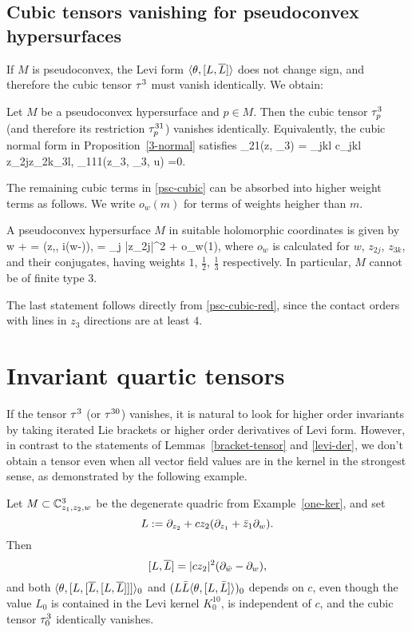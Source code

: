 \documentclass[12pt]{amsart}
\begin{document}
\subsection{Cubic tensors vanishing for pseudoconvex hypersurfaces}
If $M$ is pseudoconvex, the Levi form $\langle \theta, [L, \overline{L}]\rangle$
does not change sign, and therefore the cubic tensor $\tau^3$ must vanish identically. We obtain:

\bl{}
Let $M$ be a pseudoconvex hypersurface and $p\in M$.
Then the cubic tensor $\tau^3_p$ (and therefore its restriction $\tau^{31}_p$) vanishes identically.
Equivalently, the cubic normal form in Proposition~\ref{3-normal} satisfies
\beq{}
	\phi_{21}(z, \z_3) = \sum_{jkl} c_{jkl} z_{2j}z_{2k}\z_{3l},
	\quad
	\phi_{111}(z_3, \z_3, u) =0.
\eeq
\el

The remaining cubic terms in \eqref{psc-cubic} 
can be absorbed into higher weight terms as follows.
We write $o_w(m)$ for terms of weights heigher than $m$.

\bc{}
A pseudoconvex hypersurface $M$ in suitable holomorphic coordinates
is given by
\beq{}
w + \w = \phi(z,\z, i(w-\w)), 
\quad
\phi =
 \sum_j |z_{2j}|^2 + o_w(1),
\eeq
where $o_w$ is calculated for $w$, $z_{2j}$, $z_{3k}$, and their conjugates, 
having weights 
$1$, $\frac12$, $\frac13$ respectively.
In particular, $M$ cannot be of finite type $3$.
\ec

The last statement follows directly from \eqref{psc-cubic-red},
since the contact orders  with lines in $z_3$ directions
are at least $4$.



\section{Invariant quartic tensors}
If the tensor $\tau^3$ (or $\tau^{30}$) vanishes,
it is natural to look for higher order invariants by taking iterated Lie brackets
or higher order derivatives of Levi form.
However, 
in contrast to the statements of Lemmas~\ref{bracket-tensor} 
and \ref{levi-der},
we don't obtain a tensor
even when all vector field values are in the kernel in the strongest sense,
as demonstrated by the following example.

\be{}
Let $M\subset {\mathbb{C}}^3_{z_1, z_2, w}$ be 
the degenerate quadric 
from Example~\ref{one-ker},
and set 
$$
	L:=\partial_{z_2} +  c z_2(\partial_{z_1} + {\bar z}_1\partial_w).
$$
Then 
$$
	[L, \overline{L}] = |c z_2|^2 (\partial_{{\bar w}} - \partial_w),
$$
and
both $\langle \theta, [L, [\overline{L}, [L, \overline{L}]]] \rangle_0$
and $(L\bar L \langle \theta,  [L, \bar L] \rangle)_0 $
depends on $c$, even though
the value $L_0$ is contained in the Levi kernel $K_0^{10}$,
is independent of $c$,
and the cubic tensor $\tau^3_0$ identically vanishes.
\ee
\end{document}
